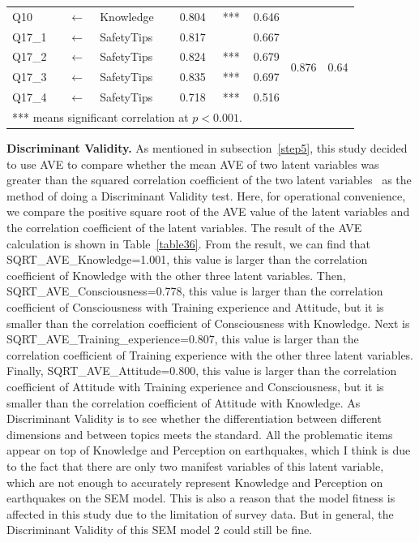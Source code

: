 \begin{table}[h]
\begin{tabular}{lcl|cc|ccc}
\hline
Q10                  & $\longleftarrow$       & Knowledge            & 0.804  & ***                  & 0.646                &                        &                        \\
Q17\_1               & $\longleftarrow$       & SafetyTips           & 0.817  &  & 0.667                & \multirow{4}{*}{0.876} & \multirow{4}{*}{0.64}  \\
\hline
Q17\_2               & $\longleftarrow$       & SafetyTips           & 0.824  & ***                  & 0.679                &                        &                        \\
Q17\_3               & $\longleftarrow$       & SafetyTips           & 0.835  & ***                  & 0.697                &                        &                        \\
Q17\_4               & $\longleftarrow$       & SafetyTips           & 0.718  & ***                  & 0.516                &                        &                       \\
  \hline
\multicolumn{5}{l}{*** means significant correlation at $p<0.001$.}
  \end{tabular}
\end{table}




\textbf{Discriminant Validity.} As mentioned in subsection~\ref{step5}, this study decided to use AVE to compare whether the mean AVE of two latent variables was greater than the squared correlation coefficient of the two latent variables~\cite{ref31} as the method of doing a Discriminant Validity test. Here, for operational convenience, we compare the positive square root of the AVE value of the latent variables and the correlation coefficient of the latent variables. The result of the AVE calculation is shown in Table~\ref{table36}. From the result, we can find that SQRT\_AVE\_Knowledge=1.001, this value is larger than the correlation coefficient of Knowledge with the other three latent variables. Then, SQRT\_AVE\_Consciousness=0.778, this value is larger than the correlation coefficient of Consciousness with Training experience and Attitude, but it is smaller than the correlation coefficient of Consciousness with Knowledge. Next is SQRT\_AVE\_Training\_experience=0.807, this value is larger than the correlation coefficient of Training experience with the other three latent variables. Finally, SQRT\_AVE\_Attitude=0.800, this value is larger than the correlation coefficient of Attitude with Training experience and Consciousness, but it is smaller than the correlation coefficient of Attitude with Knowledge. As Discriminant Validity is to see whether the differentiation between different dimensions and between topics meets the standard. All the problematic items appear on top of Knowledge and Perception on earthquakes, which I think is due to the fact that there are only two manifest variables of this latent variable, which are not enough to accurately represent Knowledge and Perception on earthquakes on the SEM model. This is also a reason that the model fitness is affected in this study due to the limitation of survey data. But in general, the Discriminant Validity of this SEM model 2 could still be fine.

